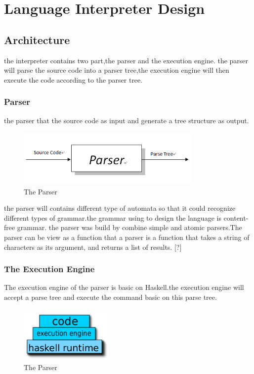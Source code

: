 \chapter{Language Interpreter Design}
\section{Architecture}
the interpreter contains two part,the parser and the execution engine. the
parser will parse the source code into a parser tree,the execution engine will
then execute the code according to the parser tree.

\subsection{Parser}
the parser that the source code as input and generate a tree structure as
output.

\begin{figure}[h!]
  \centering
	\includegraphics[width=0.80\textwidth]{pic/c4/parser.png}
	\caption{The Parser}
\end{figure}
the parser will contains different type of automata so that it could recognize different types of grammar.the grammar using to design the language
is content-free grammar.
the parser was build by combine simple and atomic parsers.The parser
can be view as a function that a parser is a function that takes a string of
characters as its argument, and returns a list of results. [?]

\subsection{The Execution Engine}
The execution engine of the parser is basic on Haskell.the execution engine
will accept a parse tree and execute the command basic on this parse tree.
\begin{figure}[h!]
  \centering
	\includegraphics[width=0.40\textwidth]{pic/c4/structure.png}
	\caption{The Parser}
\end{figure}



